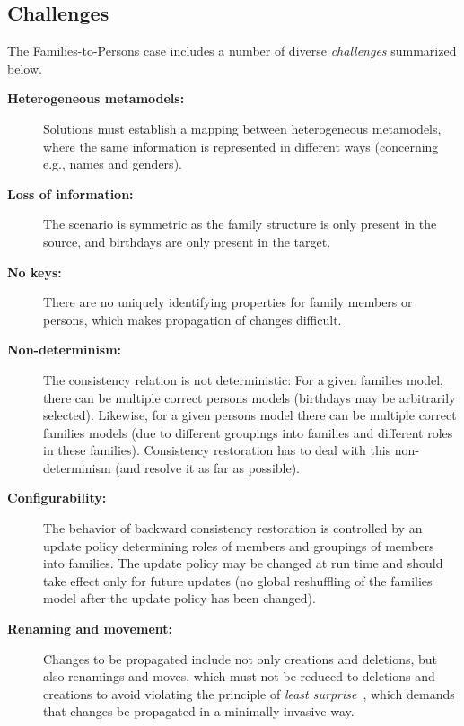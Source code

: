 \subsection{Challenges}
\label{sec:Challenges}

The Families-to-Persons case includes a number of diverse \emph{challenges} summarized below.

\begin{description}
	\item[\textbf{Heterogeneous metamodels:}] 
	Solutions must establish a mapping between heterogeneous metamodels, where the same information is represented in different ways (concerning e.g., names and genders).
	
	\item[\textbf{Loss of information:}] 
	The scenario is symmetric as the family structure is only present in the source, and birthdays are only present in the target.
	
	\item[\textbf{No keys:}] 
	There are no uniquely identifying properties for family members or persons, which makes propagation of changes difficult.
	
	\item[\textbf{Non-determinism:}] 
	The consistency relation is not de\-ter\-mi\-ni\-stic: For a given families model, there can be multiple correct persons models (birthdays may be arbitrarily selected). 
	Likewise, for a given persons model there can be multiple correct families models (due to different groupings into families and different roles in these families). Consistency restoration has to deal with this non-determinism (and resolve it as far as possible).
	
	\item[\textbf{Configurability:}] 
	The behavior of backward con\-sis\-ten\-cy restoration is controlled by an update policy determining roles of members and groupings of members into families. 
	The update policy may be changed at run time and should take effect only for future updates (no global reshuffling of the families model after the update policy has been changed).
	
	\item[\textbf{Renaming and movement:}] 
	Changes to be pro\-pa\-ga\-ted include not only creations and deletions, but also renamings and moves, which must not be reduced to deletions and creations to avoid violating the principle of \emph{least surprise}~\cite{Cheney2015,SOSYM-Macedo2016}, which demands that changes be propagated in a minimally invasive way. 
	

\end{description}
